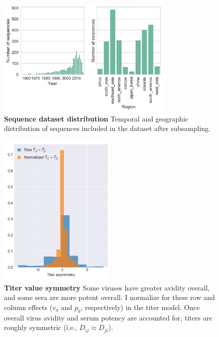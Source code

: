 \begin{figure}[h!]
\centering
	\includegraphics[width=0.75\textwidth]{./png/sequence_distribution.png}
	\caption[Sequence dataset distribution]{\textbf{Sequence dataset distribution }
  Temporal and geographic distribution of sequences included in the dataset after subsampling.
	}
	\label{sequence_distribution}
\end{figure}

\begin{figure}[h!]
  \centering
  \includegraphics[width=0.5\textwidth]{./png/titer_asymmetry.png}
  \caption[Titer value symmetry]{\textbf{Titer value symmetry }
  Some viruses have greater avidity overall, and some sera are more potent overall.
  I normalize for these row and column effects ($v_a$ and $p_b$, respectively) in the titer model.
  Once overall virus avidity and serum potency are accounted for, titers are roughly symmetric (i.e., $D_{ij} \approx D_{ji}$).
  }
\label{titer_asymmetry}
\end{figure}


